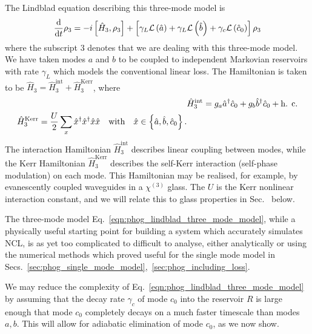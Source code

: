 The Lindblad equation describing this three-mode model is
\begin{equation}\label{eqn:phog_lindblad_three_mode_model}
\frac{\mathrm{d}}{\mathrm{d}t} \rho_3 = - i \left[ \hat{H}_3, \rho_3\right] + \left[ \gamma_L \mathcal{L}\left(\hat{a}\right) + \gamma_L \mathcal{L}\left(\hat{b}\right) + \gamma_c \mathcal{L}\left(\hat{c}_0\right)\right] \rho_3
\end{equation}
where the subscript $3$ denotes that we are dealing with this three-mode model. We have taken modes $a$ and $b$ to be coupled to independent Markovian reservoirs with rate $\gamma_L$ which models the conventional linear loss. The Hamiltonian is taken to be $\hat{H}_3 = \hat{H}_3^{\text{int}} + \hat{H}_3^{\text{Kerr}}$, where
\begin{align}
&\hat{H}_3^{\text{int}} = g_a \hat{a}^\dagger \hat{c}_0 + g_b \hat{b}^\dagger \hat{c}_0 + \hc \notag \\
%
\hat{H}_3^{\text{Kerr}} = \frac{U}{2} \sum_{x} \hat{x}^\dagger \hat{x}^\dagger \hat{x} \hat{x} \qq{with} \hat{x} \in \left\{\hat{a}, \hat{b}, \hat{c}_0\right\}.
\end{align}
The interaction Hamiltonian $\hat{H}_3^{\text{int}}$ describes linear coupling between modes, while the Kerr Hamiltonian $\hat{H}_3^{\text{Kerr}}$ describes the self-Kerr interaction (self-phase modulation)%
on each mode. This Hamiltonian may be realised, for example, by evanescently coupled waveguides in a $\chi^{\left(3\right)}$ glass. The $U$ is the Kerr nonlinear interaction constant, and we will relate this to glass properties in Sec.~ below.

The three-mode model Eq.~\ref{eqn:phog_lindblad_three_mode_model}, while a physically useful starting point for building a system which accurately simulates NCL, is as yet too complicated to difficult to analyse, either analytically or using the numerical methods which proved useful for the single mode model in Secs.~\ref{sec:phog_single_mode_model},~\ref{sec:phog_including_loss}. 

We may reduce the complexity of Eq.~\ref{eqn:phog_lindblad_three_mode_model} by assuming that the decay rate $\gamma_c$ of mode $c_0$ into the reservoir $R$ is large enough that mode $c_0$ completely decays on a much faster timescale than modes $a, b$. This will allow for adiabatic elimination of mode $c_0$, as we now show.











